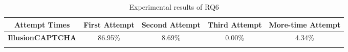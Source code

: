 \begin{table*}[t!]
    \centering
    \tabcolsep=1.5pt
    \renewcommand{\arraystretch}{0.92} 
    \caption{Experimental results of RQ6}
    \begin{tabular}{ccccc}
    \hline
    \multicolumn{1}{c|}{\textbf{Attempt Times}}   & \multicolumn{1}{c|}{\textbf{First Attempt}} & \multicolumn{1}{c|}{\textbf{Second Attempt}} & \multicolumn{1}{c|}{\textbf{Third Attempt}} & \textbf{More-time Attempt} \\ \hline
    \multicolumn{1}{c|}{\textbf{IllusionCAPTCHA}} & 86.95\%                                     & 8.69\%                                       & 0.00\%                                      & 4.34\%                     \\ \hline
    \multicolumn{1}{l}{}                          & \multicolumn{1}{l}{}                        & \multicolumn{1}{l}{}                         & \multicolumn{1}{l}{}                        & \multicolumn{1}{l}{}      
    \end{tabular}
\label{tex:RQ4}
\end{table*}